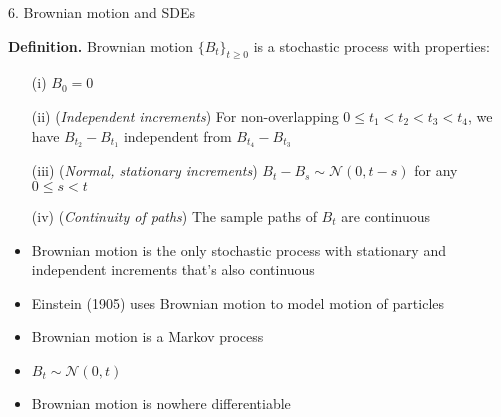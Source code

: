 \documentclass[10pt]{beamer}
\begin{document}
\begin{frame}{6. Brownian motion and SDEs}

{\small
\textbf{Definition.} Brownian motion $\{B_t\}_{t\geq 0}$ is a stochastic process with properties:
\begin{itemize}
	\item [(i)] $B_0 = 0$
	
	\item [(ii)] (\textit{Independent increments}) For non-overlapping $0 \leq t_1 < t_2 < t_3 < t_4$, we have $B_{t_2} - B_{t_1}$ independent from $B_{t_4} - B_{t_3}$
	
	\item [(iii)] (\textit{Normal, stationary increments}) $B_t - B_s \sim \mathcal N(0, t-s)$ for any $0 \leq s < t$
	
	\item [(iv)]  (\textit{Continuity of paths}) The sample paths of $B_t$ are continuous
\end{itemize}

\vspace{6mm}
\begin{itemize}
\item Brownian motion is the only stochastic process with stationary and independent increments that's also continuous

\vspace{-3mm}
\item Einstein (1905) uses Brownian motion to model motion of particles

\vspace{-3mm}
\item Brownian motion is a Markov process

\vspace{-3mm}
\item $B_t \sim \mathcal N(0, t)$

\vspace{-3mm}
\item Brownian motion is nowhere differentiable
\end{itemize}
}
\end{frame}
\end{document}
